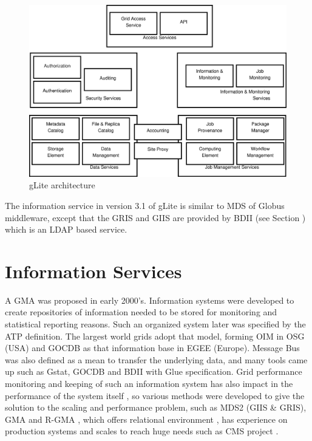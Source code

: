 \begin{figure}[htb]
\centering
 \includegraphics[width=130mm]{images/glite.eps}
\caption{gLite architecture}
\label{figure:glite}
\end{figure}

The information service in version 3.1 of gLite is similar to \ac{MDS} of Globus middleware, except that the \ac{GRIS} and \ac{GIIS} are provided by \ac{BDII} (see Section ) which is an LDAP based service.

\section{Information Services}
A \ac{GMA} \cite{tierney2002grid} was proposed in early 2000's. Information systems were developed to create repositories of information needed to be stored for monitoring and statistical reporting reasons. Such an organized system later was specified by the \ac{ATP} definition. The largest world grids adopt that model, forming \ac{OIM} in \ac{OSG} (USA) and \ac{GOCDB} as that information base in \ac{EGEE} (Europe). Message Bus was also defined as a mean to transfer the underlying data, and many tools came up such as Gstat, \ac{GOCDB} and \ac{BDII} with Glue specification. Grid performance monitoring and keeping of such an information system has also impact in the performance of the system itself \cite{zhang2003performance}, so various methods were developed to give the solution to the scaling and performance problem, such as \ac{MDS}2 (\ac{GIIS} \& \ac{GRIS}), \ac{GMA} and \ac{R-GMA} \cite{wilson2004information}, which offers relational environment \cite{fisher2001relational}, has experience on production systems \cite{byrom-production} and scales to reach huge needs such as \ac{CMS} project \cite{Bonacorsi2004,Byrom}.

